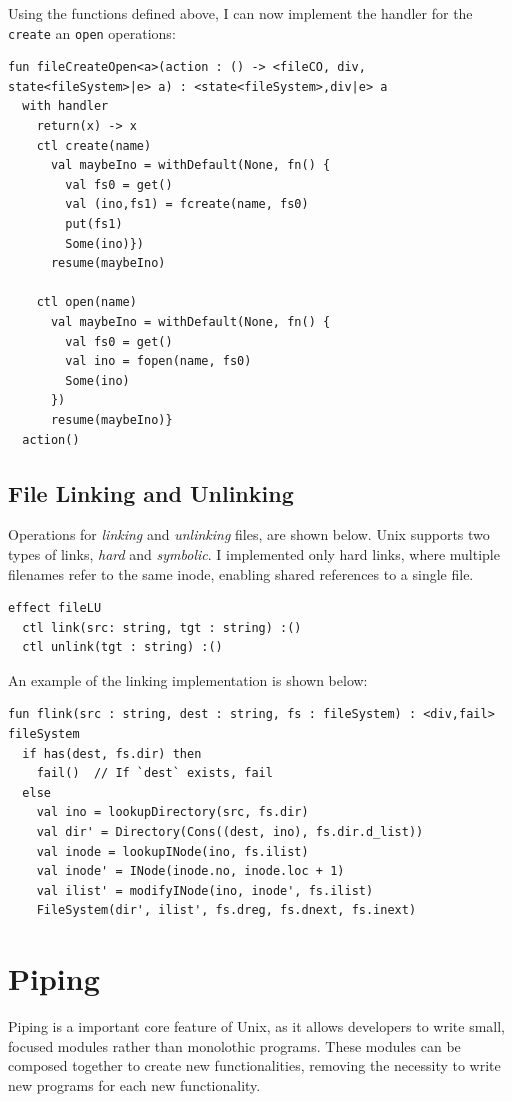 \documentclass[logo,bsc,singlespacing,parskip]{infthesis}
\begin{document}
Using the functions defined above, I can now implement the handler for the \lstinline{create} an \lstinline{open} operations:

\begin{lstlisting}
fun fileCreateOpen<a>(action : () -> <fileCO, div, state<fileSystem>|e> a) : <state<fileSystem>,div|e> a
  with handler 
    return(x) -> x
    ctl create(name) 
      val maybeIno = withDefault(None, fn() {
        val fs0 = get()
        val (ino,fs1) = fcreate(name, fs0)
        put(fs1)
        Some(ino)})
      resume(maybeIno)

    ctl open(name) 
      val maybeIno = withDefault(None, fn() {
        val fs0 = get()
        val ino = fopen(name, fs0)
        Some(ino)
      })
      resume(maybeIno)}  
  action()
\end{lstlisting}

\subsection{File Linking and Unlinking}
Operations for \textit{linking} and \textit{unlinking} files, are shown below. Unix supports two types of links, \textit{hard} and \textit{symbolic}. I implemented only hard links, where multiple filenames refer to the same inode, enabling shared references to a single file.

\begin{lstlisting}
effect fileLU
  ctl link(src: string, tgt : string) :()
  ctl unlink(tgt : string) :()
\end{lstlisting}

An example of the linking implementation is shown below:
\begin{lstlisting}
fun flink(src : string, dest : string, fs : fileSystem) : <div,fail> fileSystem 
  if has(dest, fs.dir) then
    fail()  // If `dest` exists, fail
  else 
    val ino = lookupDirectory(src, fs.dir)
    val dir' = Directory(Cons((dest, ino), fs.dir.d_list))
    val inode = lookupINode(ino, fs.ilist)
    val inode' = INode(inode.no, inode.loc + 1)
    val ilist' = modifyINode(ino, inode', fs.ilist)
    FileSystem(dir', ilist', fs.dreg, fs.dnext, fs.inext)
\end{lstlisting}


\section{Piping}
Piping is a important core feature of Unix,  as it allows developers to write  small, focused modules rather than monolothic programs. These modules can be composed together to create new functionalities, removing the necessity to write new programs for each new functionality.
\end{document}
